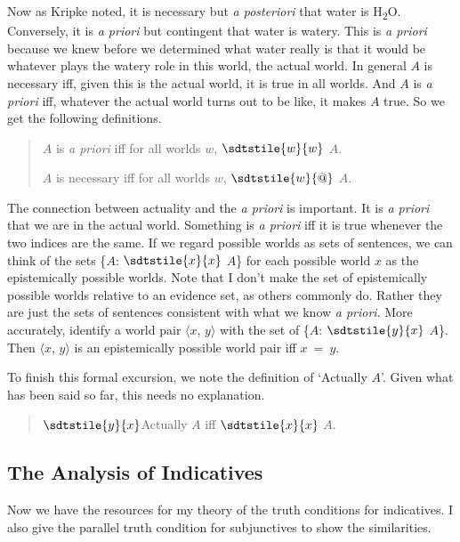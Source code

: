 \noindent Now as Kripke noted, it is necessary but \textit{a posteriori} that water is H\textsubscript{2}O. Conversely, it is \textit{a priori} but contingent that water is watery. This is \textit{a priori} because we knew before we determined what water really is that it would be whatever plays the watery role in this world, the actual world. In general \(A\) is necessary iff, given this is the actual world, it is true in all worlds. And \(A\) is \textit{a priori} iff, whatever the actual world turns out to be like, it makes \(A\) true. So we get the following definitions.

\begin{quote}
\(A\) is \textit{a priori} iff for all worlds \(w\), \(\sdtstile{w}{w}\) \(A\).

\(A\) is necessary iff for all worlds \(w\), \(\sdtstile{w}{@}\) \(A\).
\end{quote}

\noindent The connection between actuality and the \textit{a priori} is important. It is \textit{a priori} that we are in the actual world. Something is \textit{a priori} iff it is true whenever the two indices are the same. If we regard possible worlds as sets of sentences, we can think of the sets \{\(A\): \(\sdtstile{x}{x}\) \(A\)\} for each possible world \(x\) as the epistemically possible worlds. Note that I don't make the set of epistemically possible worlds relative to an evidence set, as others commonly do. Rather they are just the sets of sentences consistent with what we know \textit{a priori}. More accurately, identify a world pair \(\langle x\), \(y \rangle\) with the set of \{\(A\): \(\sdtstile{y}{x}\) \(A\)\}. Then \(\langle x\), \(y \rangle\) is an epistemically possible world pair iff \(x\)~=~\(y\).

To finish this formal excursion, we note the definition of `Actually \(A\)'. Given what has been said so far, this needs no explanation.

\begin{quote}
\(\sdtstile{y}{x}\)Actually \(A\) iff \(\sdtstile{x}{x}\) \(A\).
\end{quote}

\subsection[The Analysis of Indicatives]{The Analysis of Indicatives}
Now we have the resources for my theory of the truth conditions for indicatives. I also give the parallel truth condition for subjunctives to show the similarities.

